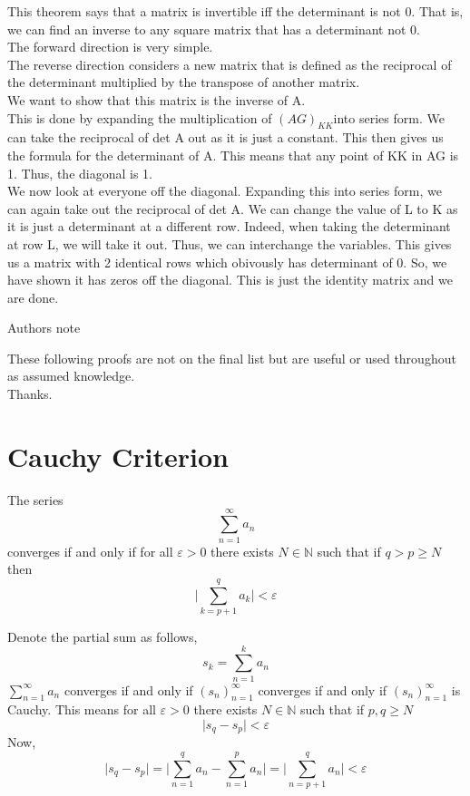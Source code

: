 \documentclass[12pt]{article}
\begin{document}
\begin{explanation}{}
    This theorem says that a matrix is invertible iff the determinant is not 0. That is, we can find an inverse to any square matrix that has a determinant not 0.\\
The forward direction is very simple.\\
The reverse direction considers a new matrix that is defined as the reciprocal of the determinant multiplied by the transpose of another matrix.\\
We want to show that this matrix is the inverse of A.\\
This is done by expanding the multiplication of $(AG)_{KK} $into series form. We can take the reciprocal of det A out as it is just a constant. This then gives us the formula for the determinant of A. This means that any point of KK in AG is 1. Thus, the diagonal is 1.\\
We now look at everyone off the diagonal. Expanding this into series form, we can again take out the reciprocal of det A. We can change the value of L to K as it is just a determinant at a different row. Indeed, when taking the determinant at row L, we will take it out. Thus, we can interchange the variables. This gives us a matrix with 2 identical rows which obivously has determinant of 0. So, we have shown it has zeros off the diagonal. This is just the identity matrix and we are done.\\
\end{explanation}


\begin{center}
    \textmd{Authors note}
\end{center}
\vspace{10mm}
These following proofs are not on the final list but are useful or used throughout as assumed knowledge.\\
Thanks.
\newpage
    \section{Cauchy Criterion}
    \begin{theo}{}
        The series
        \[\displaystyle\sum^\infty_{n=1} a_n\]
        converges if and only if for all \(\varepsilon >0\) there exists \(N \in\mathbb{N}\) such that if \(q> p \geq N\) then
        \[\bigg\vert\displaystyle\sum^q_{k=p+1} a_k\bigg\vert < \varepsilon\]
    \end{theo}
    \begin{prf}
        Denote the partial sum as follows,
        \[s_k = \displaystyle\sum^k_{n=1} a_n\]
        \(\displaystyle\sum^\infty_{n=1} a_n\) converges if and only if \((s_n)^\infty_{n=1}\) converges if and only if \((s_n)^\infty_{n=1}\) is Cauchy. This means for all \(\varepsilon > 0\) there exists \(N \in \mathbb{N}\) such that if \(p,q \geq N\)
        \[\vert s_q - s_p\vert < \varepsilon\]
        Now,
        \[\vert s_q - s_p\vert = \bigg\vert\displaystyle\sum^q_{n=1} a_n - \sum^p_{n=1} a_n\bigg\vert = \bigg\vert\displaystyle\sum^q_{n=p+1} a_n\bigg\vert < \varepsilon\]
    \end{prf}
\end{document}
